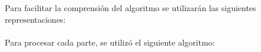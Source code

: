 \vspace{0.5cm}

Para facilitar la comprensi\'on del algoritmo se utilizar\'an las siguientes representaciones: \\
 \\


Para procesar cada parte, se utiliz\'o el siguiente algoritmo:
